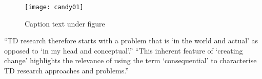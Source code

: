 %
%

\begin{figure}[htb] %
  \centering
  \texttt{[image: candy01]}
\caption[Text for Table of Contents]{Caption text under figure}
\label{fig:candy01}
\end{figure}







``TD research therefore starts with a problem that is `in the world and actual' as opposed to `in my head and conceptual'.'' ``This inherent feature of `creating change' highlights the relevance of using the term `consequential' to characterise TD research approaches and problems.'' \autocite{Wickson2006}


